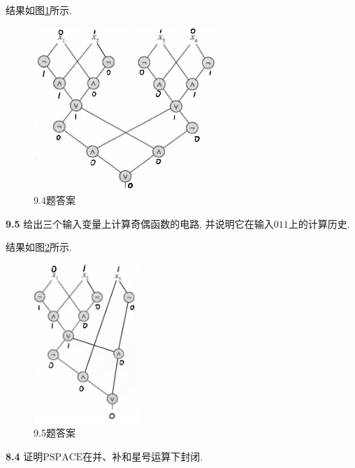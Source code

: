 \documentclass[UTF8]{report}
\newcommand{\problem}[1]{{\setlength{\parskip}{10pt}\noindent \bf{#1}}}
\newenvironment{solution}{{\noindent\hskip 2em \bf 解 \quad}}{}
\newcommand{\PSPACE}{\mathrm{PSPACE}}
\begin{document}
\begin{solution}
    结果如图\ref{fig:9_4_3}所示.
    \begin{figure}[!htbp]
        \centering
        \includegraphics[width=7cm]{image/9.4.3.png}
        \caption{9.4题答案}
        \label{fig:9_4_3}
    \end{figure}
\end{solution}


\problem{9.5} 给出三个输入变量上计算奇偶函数的电路, 并说明它在输入$011$上的计算历史. 

\begin{solution}
    结果如图\ref{fig:9_5}所示.
    \begin{figure}[!htbp]
        \centering
        \includegraphics[width=4cm]{image/9.5.png}
        \caption{9.5题答案}
        \label{fig:9_5}
    \end{figure}
\end{solution}


\problem{8.4} 证明$\PSPACE$在并、补和星号运算下封闭. 
\end{document}
